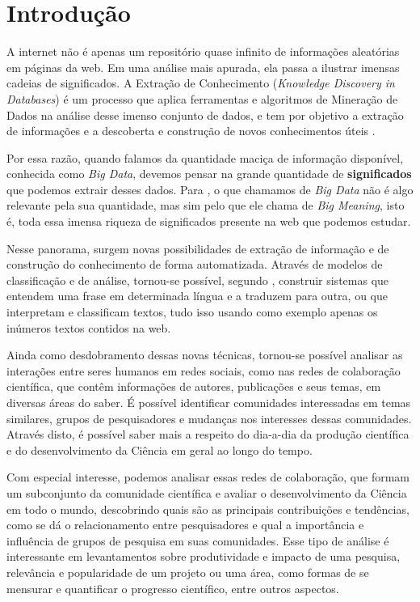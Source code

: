 \chapter{Introdução}
\label{cap:introducao}

A internet não é apenas um repositório quase infinito de informações aleatórias em páginas da web. Em uma análise mais apurada, ela passa a ilustrar imensas cadeias de significados. A Extração de Conhecimento (\textit{Knowledge Discovery in Databases}) é um processo que aplica ferramentas e algoritmos de Mineração de Dados na análise desse imenso conjunto de dados, e tem por objetivo a extração de informações e a descoberta e construção de novos conhecimentos úteis \citep{shapiro}.

Por essa razão, quando falamos da quantidade maciça de informação disponível, conhecida como \textit{Big Data}, devemos pensar na grande quantidade de \textbf{significados} que podemos extrair desses dados. Para \cite{Kay2014}, o que chamamos de \textit{Big Data} não é algo relevante pela sua quantidade, mas sim pelo que ele chama de \textit{Big Meaning}, isto é, toda essa imensa riqueza de significados presente na web que podemos estudar.

Nesse panorama, surgem novas possibilidades de extração de informação e de construção do conhecimento de forma automatizada. Através de modelos de classificação e de análise, tornou-se possível, segundo \cite{Halevy2009}, construir sistemas que entendem uma frase em determinada língua e a traduzem para outra, ou que interpretam e classificam textos, tudo isso usando como exemplo apenas os inúmeros textos contidos na web.

Ainda como desdobramento dessas novas técnicas, tornou-se possível analisar as interações entre seres humanos em redes sociais, como nas redes de colaboração científica, que contêm informações de autores, publicações e seus temas, em diversas áreas do saber. É possível identificar comunidades interessadas em temas similares, grupos de pesquisadores e mudanças nos interesses dessas comunidades. Através disto, é possível saber mais a respeito do dia-a-dia da produção científica e do desenvolvimento da Ciência em geral ao longo do tempo.

Com especial interesse, podemos analisar essas redes de colaboração, que formam um subconjunto da comunidade científica e avaliar o desenvolvimento da Ciência em todo o mundo, descobrindo quais são as principais contribuições e tendências, como se dá o relacionamento entre pesquisadores e qual a importância e influência de grupos de pesquisa em suas comunidades. Esse tipo de análise é interessante em levantamentos sobre produtividade e impacto de uma pesquisa, relevância e popularidade de um projeto ou uma área, como formas de se mensurar e quantificar o progresso científico, entre outros aspectos.

